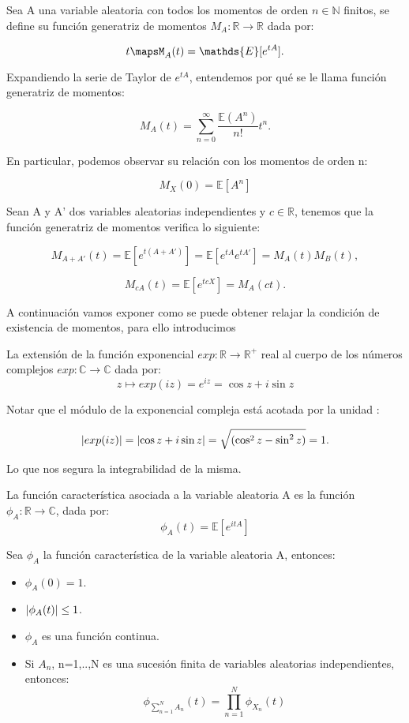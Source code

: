 \documentclass[../proyecto.tex]{memoir}
\begin{document}
\begin{defi}
Sea A una variable aleatoria con todos los momentos de orden $n\in\mathds{N}$ finitos, se define su función generatriz de momentos $M_A : \mathds{R} \to \mathds{R}$ dada por:

$$
t \mapsM_A(t)=\mathds{E}[e^{tA}].
$$
\end{defi}
Expandiendo la serie de Taylor de $e^{tA}$, entendemos por qué se le llama función generatriz de momentos:

$$
M_A(t)=\sum_{n=0}^{\infty} \frac{\mathds{E}(A^n)}{n!}t^n.
$$

En particular, podemos observar su relación con los momentos de orden n:

$$
M_X(0)=\mathds{E}[A^n]
$$

Sean A y A' dos variables aleatorias independientes y $c \in \mathds{R}$, tenemos que la función generatriz de momentos verifica lo siguiente:

$$
M_{A+A'}(t)=\mathds{E}[e^{t(A+A')}]=\mathds{E}[e^{tA}e^{tA'}] = M_A(t)M_B(t),
$$

$$
M_{cA}(t)=\mathds{E}[e^{tcX}]=M_A(ct).
$$

A continuación vamos exponer como se puede obtener relajar la condición de existencia de momentos, para ello introducimos 

\begin{defi}
La extensión de la función exponencial $exp: \mathds{R} \to \mathds{R^{+}}$ real al cuerpo de los números complejos $exp: \mathds{C} \to \mathds{C}$ dada por:
$$
z \mapsto exp(iz) = e^{iz}=\cos z+i\sin z
$$
\end{defi}

Notar que el módulo de la exponencial compleja está acotada por la unidad :

$$
\abs{ exp(iz) } = \abs{\cos z+i\sin z} = \sqrt{( \cos^2 z - \sin^2 z)} = 1.
$$

Lo que nos segura la integrabilidad de la misma.

\begin{defi}
La función característica asociada a la variable aleatoria A es la función $\phi_{A}: \mathds{R} \to \mathds{C}$, dada por:
$$
\phi_{A}(t) = \mathds{E}[e^{itA}]
$$
\end{defi}


\begin{prop}
Sea $\phi_A$ la función característica de la variable aleatoria A, entonces:

\begin{itemize}
\item $\phi_A(0) = 1$.
\item $\abs{\phi_A(t)} \leq 1$.
\item $\phi_A$ es una función continua.
\item Si $A_n$, n=1,..,N es una sucesión finita de variables aleatorias independientes, entonces: $$ 
\phi_{\sum^{N}_{n=1} A_n} (t) = \prod_{n=1}^{N} \phi_{X_n} (t) 
$$

\end{itemize}

\end{prop}
\end{document}
